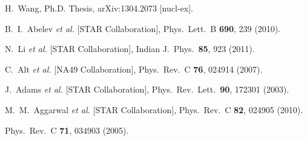 \begin{thebibliography}{99}
  H.~Wang, Ph.D. Thesis,
  arXiv:1304.2073 [nucl-ex].

  B.~I.~Abelev {\it et al.} [STAR Collaboration],
  Phys.\ Lett.\ B {\bf 690}, 239 (2010).

\cite{Li:2011zzx}
  N.~Li {\it et al.} [STAR Collaboration],
  Indian J.\ Phys.\  {\bf 85}, 923 (2011).

  C.~Alt {\it et al.} [NA49 Collaboration],
  Phys.\ Rev.\ C {\bf 76}, 024914 (2007).

  J.~Adams {\it et al.} [STAR Collaboration],
  Phys.\ Rev.\ Lett.\  {\bf 90}, 172301 (2003).
   
  M.~M.~Aggarwal {\it et al.} [STAR Collaboration],
  Phys.\ Rev.\ C {\bf 82}, 024905 (2010).

\cite{Alt:2004gx}
  Phys.\ Rev.\ C {\bf 71}, 034903 (2005).


\end{thebibliography}
